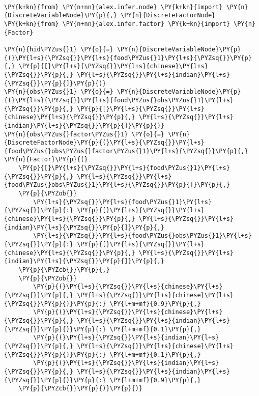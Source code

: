 \begin{example}
\begin{Verbatim}[commandchars=\\\{\}, fontsize=\relsize{-1}]

\PY{k+kn}{from} \PY{n+nn}{alex.infer.node} \PY{k+kn}{import} \PY{n}{DiscreteVariableNode}\PY{p}{,} \PY{n}{DiscreteFactorNode}
\PY{k+kn}{from} \PY{n+nn}{alex.infer.factor} \PY{k+kn}{import} \PY{n}{Factor}

\PY{n}{hid\PYZus{}1} \PY{o}{=} \PY{n}{DiscreteVariableNode}\PY{p}{(}\PY{l+s}{\PYZsq{}}\PY{l+s}{food\PYZus{}1}\PY{l+s}{\PYZsq{}}\PY{p}{,} \PY{p}{[}\PY{l+s}{\PYZsq{}}\PY{l+s}{chinese}\PY{l+s}{\PYZsq{}}\PY{p}{,} \PY{l+s}{\PYZsq{}}\PY{l+s}{indian}\PY{l+s}{\PYZsq{}}\PY{p}{]}\PY{p}{)}
\PY{n}{obs\PYZus{}1} \PY{o}{=} \PY{n}{DiscreteVariableNode}\PY{p}{(}\PY{l+s}{\PYZsq{}}\PY{l+s}{food\PYZus{}obs\PYZus{}1}\PY{l+s}{\PYZsq{}}\PY{p}{,} \PY{p}{[}\PY{l+s}{\PYZsq{}}\PY{l+s}{chinese}\PY{l+s}{\PYZsq{}}\PY{p}{,} \PY{l+s}{\PYZsq{}}\PY{l+s}{indian}\PY{l+s}{\PYZsq{}}\PY{p}{]}\PY{p}{)}
\PY{n}{obs\PYZus{}factor\PYZus{}1} \PY{o}{=} \PY{n}{DiscreteFactorNode}\PY{p}{(}\PY{l+s}{\PYZsq{}}\PY{l+s}{food\PYZus{}obs\PYZus{}factor\PYZus{}1}\PY{l+s}{\PYZsq{}}\PY{p}{,} \PY{n}{Factor}\PY{p}{(}
    \PY{p}{[}\PY{l+s}{\PYZsq{}}\PY{l+s}{food\PYZus{}1}\PY{l+s}{\PYZsq{}}\PY{p}{,} \PY{l+s}{\PYZsq{}}\PY{l+s}{food\PYZus{}obs\PYZus{}1}\PY{l+s}{\PYZsq{}}\PY{p}{]}\PY{p}{,}
    \PY{p}{\PYZob{}}
        \PY{l+s}{\PYZsq{}}\PY{l+s}{food\PYZus{}1}\PY{l+s}{\PYZsq{}}\PY{p}{:} \PY{p}{[}\PY{l+s}{\PYZsq{}}\PY{l+s}{chinese}\PY{l+s}{\PYZsq{}}\PY{p}{,} \PY{l+s}{\PYZsq{}}\PY{l+s}{indian}\PY{l+s}{\PYZsq{}}\PY{p}{]}\PY{p}{,}
        \PY{l+s}{\PYZsq{}}\PY{l+s}{food\PYZus{}obs\PYZus{}1}\PY{l+s}{\PYZsq{}}\PY{p}{:} \PY{p}{[}\PY{l+s}{\PYZsq{}}\PY{l+s}{chinese}\PY{l+s}{\PYZsq{}}\PY{p}{,} \PY{l+s}{\PYZsq{}}\PY{l+s}{indian}\PY{l+s}{\PYZsq{}}\PY{p}{]}\PY{p}{,}
    \PY{p}{\PYZcb{}}\PY{p}{,}
    \PY{p}{\PYZob{}}
        \PY{p}{(}\PY{l+s}{\PYZsq{}}\PY{l+s}{chinese}\PY{l+s}{\PYZsq{}}\PY{p}{,} \PY{l+s}{\PYZsq{}}\PY{l+s}{chinese}\PY{l+s}{\PYZsq{}}\PY{p}{)}\PY{p}{:} \PY{l+m+mf}{0.9}\PY{p}{,}
        \PY{p}{(}\PY{l+s}{\PYZsq{}}\PY{l+s}{chinese}\PY{l+s}{\PYZsq{}}\PY{p}{,} \PY{l+s}{\PYZsq{}}\PY{l+s}{indian}\PY{l+s}{\PYZsq{}}\PY{p}{)}\PY{p}{:} \PY{l+m+mf}{0.1}\PY{p}{,}
        \PY{p}{(}\PY{l+s}{\PYZsq{}}\PY{l+s}{indian}\PY{l+s}{\PYZsq{}}\PY{p}{,} \PY{l+s}{\PYZsq{}}\PY{l+s}{chinese}\PY{l+s}{\PYZsq{}}\PY{p}{)}\PY{p}{:} \PY{l+m+mf}{0.1}\PY{p}{,}
        \PY{p}{(}\PY{l+s}{\PYZsq{}}\PY{l+s}{indian}\PY{l+s}{\PYZsq{}}\PY{p}{,} \PY{l+s}{\PYZsq{}}\PY{l+s}{indian}\PY{l+s}{\PYZsq{}}\PY{p}{)}\PY{p}{:} \PY{l+m+mf}{0.9}\PY{p}{,}
    \PY{p}{\PYZcb{}}\PY{p}{)}\PY{p}{)}


\end{Verbatim}
\end{example}
